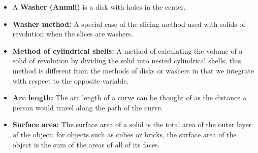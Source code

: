 \documentclass{report}
\begin{document}
\begin{itemize}
        \item A \textbf{Washer (Annuli)} is a disk with holes in the center.
        \item \textbf{Washer method:} A special case of the slicing method used with solids of revolution when the slices are washers.
        \item \textbf{Method of cylindrical shells:} A method of calculating the volume of a solid of revolution by dividing the solid into nested cylindrical shells; this method is different from the methods of disks or washers in that we integrate with respect to the opposite variable.
         \item \textbf{Arc length:} The arc length of a curve can be thought of as the distance a person would travel along the path of the curve.
        \item \textbf{Surface area:} The surface area of a solid is the total area of the outer layer of the object; for objects such as cubes or bricks, the surface area of the object is the sum of the areas of all of its faces.

\end{itemize}
\end{document}
